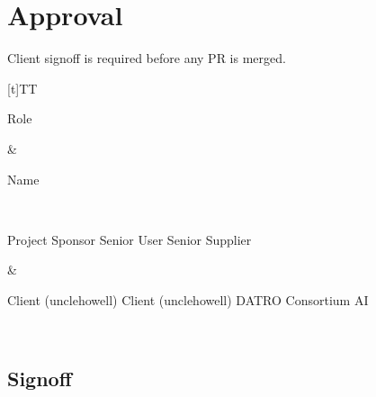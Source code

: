 \documentclass[letterpaper,10pt,openany,oneside,english]{sphinxmanual}
\begin{document}
\sphinxstepscope


\section{Approval}
\label{\detokenize{approval:approval}}\label{\detokenize{approval::doc}}
\sphinxAtStartPar
Client sign\sphinxhyphen{}off is required before any PR is merged.


\begin{savenotes}\sphinxattablestart
\sphinxthistablewithglobalstyle
\centering
\begin{tabulary}{\linewidth}[t]{TT}
\sphinxtoprule
\begin{varwidth}[t]{}
\sphinxstyletheadfamily \sphinxAtStartPar
Role
\sphinxbeforeendvarwidth
\end{varwidth}%
&\begin{varwidth}[t]{}
\sphinxstyletheadfamily \sphinxAtStartPar
Name
\sphinxbeforeendvarwidth
\end{varwidth}%
\\
\sphinxmidrule
\sphinxtableatstartofbodyhook\begin{varwidth}[t]{}
\sphinxAtStartPar
Project Sponsor
Senior User
Senior Supplier
\sphinxbeforeendvarwidth
\end{varwidth}%
&\begin{varwidth}[t]{}
\sphinxAtStartPar
Client (unclehowell)
Client (unclehowell)
DATRO Consortium \sphinxhyphen{} AI
\sphinxbeforeendvarwidth
\end{varwidth}%
\\
\sphinxbottomrule
\end{tabulary}
\sphinxtableafterendhook\par
\sphinxattableend\end{savenotes}


\subsection{Sign\sphinxhyphen{}off}
\label{\detokenize{approval:sign-off}}
\end{document}
